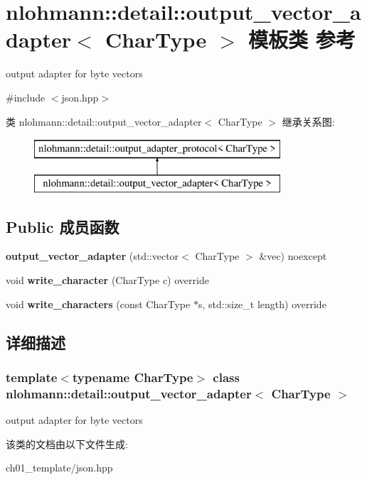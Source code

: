 \hypertarget{classnlohmann_1_1detail_1_1output__vector__adapter}{}\section{nlohmann\+::detail\+::output\+\_\+vector\+\_\+adapter$<$ Char\+Type $>$ 模板类 参考}
\label{classnlohmann_1_1detail_1_1output__vector__adapter}


output adapter for byte vectors  




{\ttfamily \#include $<$json.\+hpp$>$}

类 nlohmann\+::detail\+::output\+\_\+vector\+\_\+adapter$<$ Char\+Type $>$ 继承关系图\+:\begin{figure}[H]
\begin{center}
\leavevmode
\includegraphics[height=2.000000cm]{classnlohmann_1_1detail_1_1output__vector__adapter}
\end{center}
\end{figure}
\subsection*{Public 成员函数}
\begin{DoxyCompactItemize}
\item 
\mbox{\label{classnlohmann_1_1detail_1_1output__vector__adapter_a9c4fbf88fda356837038ec30a264cd3e}} 
{\bfseries output\+\_\+vector\+\_\+adapter} (std\+::vector$<$ Char\+Type $>$ \&vec) noexcept
\item 
\mbox{\label{classnlohmann_1_1detail_1_1output__vector__adapter_af6a22d4210bb7bc2da66021300ddd6db}} 
void {\bfseries write\+\_\+character} (Char\+Type c) override
\item 
\mbox{\label{classnlohmann_1_1detail_1_1output__vector__adapter_ad6f6c461dec7bedd5359454dc22fc9aa}} 
void {\bfseries write\+\_\+characters} (const Char\+Type $\ast$s, std\+::size\+\_\+t length) override
\end{DoxyCompactItemize}


\subsection{详细描述}
\subsubsection*{template$<$typename Char\+Type$>$\newline
class nlohmann\+::detail\+::output\+\_\+vector\+\_\+adapter$<$ Char\+Type $>$}

output adapter for byte vectors 

该类的文档由以下文件生成\+:\begin{DoxyCompactItemize}
\item 
ch01\+\_\+template/json.\+hpp\end{DoxyCompactItemize}
